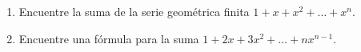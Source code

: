 \item \par
\begin{enumerate}
    \item[(a)] Encuentre la suma de la serie geométrica finita $1 + x + x^2 + \dots + x^n$.
    \item[(b)] Encuentre una fórmula para la suma $1 + 2x + 3x^2 + \dots + nx^{n-1}$.
\end{enumerate}
